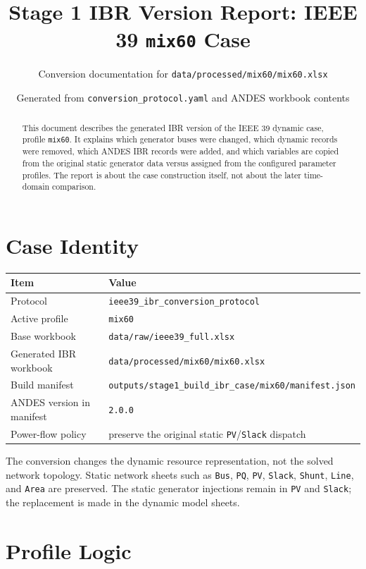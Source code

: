 \documentclass[10pt,letterpaper]{article}
\title{\textbf{Stage 1 IBR Version Report: IEEE 39 \texttt{mix60} Case}}
\author{Conversion documentation for \texttt{data/processed/mix60/mix60.xlsx}}
\date{Generated from \texttt{conversion\_protocol.yaml} and ANDES workbook contents}
\begin{document}
\maketitle

\begin{abstract}
This document describes the generated IBR version of the IEEE 39 dynamic case,
profile \texttt{mix60}. It explains which generator buses were changed, which
dynamic records were removed, which ANDES IBR records were added, and which
variables are copied from the original static generator data versus assigned
from the configured parameter profiles. The report is about the case
construction itself, not about the later time-domain comparison.
\end{abstract}

\section{Case Identity}

\begin{center}
\begin{tabular}{ll}
\toprule
Item & Value \\
\midrule
Protocol & \texttt{ieee39\_ibr\_conversion\_protocol} \\
Active profile & \texttt{mix60} \\
Base workbook & \texttt{data/raw/ieee39\_full.xlsx} \\
Generated IBR workbook & \texttt{data/processed/mix60/mix60.xlsx} \\
Build manifest & \texttt{outputs/stage1\_build\_ibr\_case/mix60/manifest.json} \\
ANDES version in manifest & \texttt{2.0.0} \\
Power-flow policy & preserve the original static \texttt{PV}/\texttt{Slack} dispatch \\
\bottomrule
\end{tabular}
\end{center}

The conversion changes the dynamic resource representation, not the solved
network topology. Static network sheets such as \texttt{Bus}, \texttt{PQ},
\texttt{PV}, \texttt{Slack}, \texttt{Shunt}, \texttt{Line}, and \texttt{Area}
are preserved. The static generator injections remain in \texttt{PV} and
\texttt{Slack}; the replacement is made in the dynamic model sheets.

\section{Profile Logic}
\end{document}
